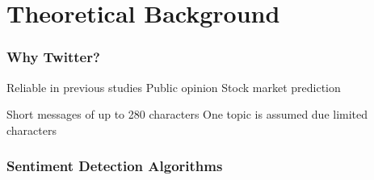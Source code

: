 
\section{Theoretical Background}

\begin{frame}
    \frametitle{Why Twitter?}

    \begin{outline}
        \1 Reliable in previous studies \citep{Barbosa2010}
            \2 Public opinion \citep{Oconnor2010a,Patodkar2016a}
            \2 Stock market prediction \citep{Bollen2011a,Mittal2012a,Nguyen2015a,Pagolu2016a,Zhang2011a}

        \1 Short messages of up to 280 characters \citep{Rosen2017}
        \1 One topic is assumed due limited characters \citep{Pagolu2016a,Patodkar2016a}
    \end{outline}
\end{frame}
  

\begin{frame}
    \frametitle{Sentiment Detection Algorithms}

    \begin{outline}
        \1 \tb{}
        \1 \nb{}
        \1 \me{}
        \1 \svm{}
    \end{outline}
\end{frame}

